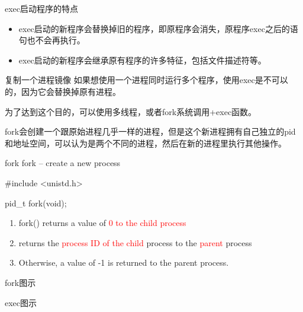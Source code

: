 \documentclass{beamer}
\begin{document}
\begin{frame}{exec启动程序的特点}
\begin{itemize}
\item
exec启动的新程序会替换掉旧的程序，即原程序会消失，原程序exec之后的语句也不会再执行。
\item
exec启动的新程序会继承原有程序的许多特征，包括文件描述符等。
\end{itemize}
\end{frame}
\begin{frame}{复制一个进程镜像}
如果想使用一个进程同时运行多个程序，使用exec是不可以的，因为它会替换掉原有进程。

为了达到这个目的，可以使用多线程，或者fork系统调用+exec函数。

fork会创建一个跟原始进程几乎一样的进程，但是这个新进程拥有自己独立的pid和地址空间，可以认为是两个不同的进程，然后在新的进程里执行其他操作。
\begin{block}{fork}
 fork -- create a new process

\#include <unistd.h>

pid\_t   fork(void);
\end{block}

\begin{enumerate}
\item
fork() returns a value of \textcolor{red}{0 to the child process}
\item
returns the \textcolor{red}{process ID of the child} process to the \textcolor{red}{parent} process
\item
Otherwise, a value of -1 is returned to the parent process.
\end{enumerate}
\end{frame}
\begin{frame}{fork图示}
\end{frame}
\begin{frame}{exec图示}
\end{frame}
\end{document}

